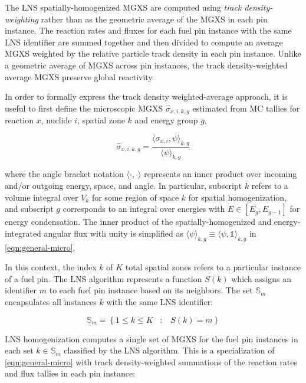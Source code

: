 The LNS spatially-homogenized MGXS are computed using \textit{track density-weighting} rather than as the geometric average of the MGXS in each pin instance. The reaction rates and fluxes for each fuel pin instance with the same LNS identifier are summed together and then divided to compute an average MGXS weighted by the relative particle track density in each pin instance. Unlike a geometric average of MGXS across pin instances, the track density-weighted average MGXS preserve global reactivity.


In order to formally express the track density weighted-average approach, it is useful to first define the microscopic MGXS $\hat{\sigma}_{x,i,k,g}$ estimated from MC tallies for reaction $x$, nuclide $i$, spatial zone $k$ and energy group $g$,

\begin{equation}
\label{eqn:general-micro}
\hat{\sigma}_{x,i,k,g} = \frac{\langle \sigma_{x,i}, \psi \rangle_{k,g}}{\langle \psi \rangle_{k,g}}
\end{equation}

\noindent where the angle bracket notation $\langle \cdot , \cdot \rangle$ represents an inner product over incoming and/or outgoing energy, space, and angle. In particular, subscript $k$ refers to a volume integral over $V_{k}$ for some region of space $k$ for spatial homogenization, and subscript $g$ corresponds to an integral over energies with $E \in [E_{g}, E_{g-1}]$ for energy condensation. The inner product of the spatially-homogenized and energy-integrated angular flux with unity is simplified as $\langle \psi \rangle_{k,g} \equiv \langle \psi, \mathbb{1} \rangle_{k,g}$ in \autoref{eqn:general-micro}.

In this context, the index $k$ of $K$ total spatial zones refers to a particular instance of a fuel pin. The LNS algorithm represents a function $S(k)$ which assigns an identifier $m$ to each fuel pin instance based on its neighbors. The set $\mathbb{S}_{m}$ encapsulates all instances $k$ with the same LNS identifier:

\begin{equation}
\label{eqn:lns-set}
\mathbb{S}_{m} = \left\{1 \le k \le K \;\;\; : \;\;\; S(k) = m\right\}
\end{equation}

LNS homogenization computes a single set of MGXS for the fuel pin instances in each set $k \in \mathbb{S}_{m}$ classified by the LNS algorithm. This is a specialization of \autoref{eqn:general-micro} with track density-weighted summations of the reaction rates and flux tallies in each pin instance:

